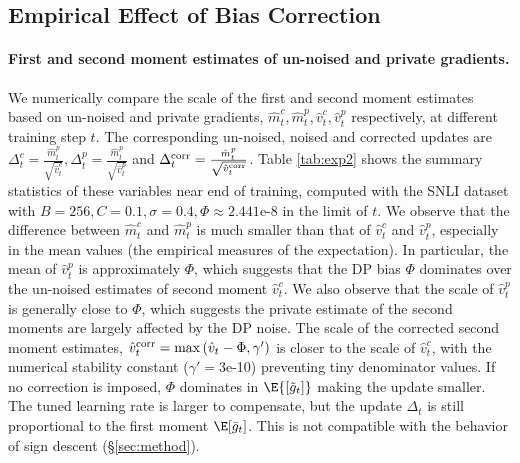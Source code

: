 \documentclass[letterpaper]{article} %
\begin{document}
\subsection{Empirical Effect of Bias Correction}
\label{eval:empirical-effect-correction}

\paragraph{First and second moment estimates of un-noised and private gradients.}
We numerically compare the scale of the first and second moment estimates based on un-noised and private gradients, $\hat{m}_t^c, \hat{m}_t^p, \hat{v}_t^c, \hat{v}_t^p$ respectively, at different training step $t$. The corresponding un-noised, noised and corrected updates are $\Delta_t^{c} = \frac{\hat{m}_t^p}{\sqrt{\hat{v}_t^c}}, \Delta_t^{p} = \frac{\hat{m}_t^p}{\sqrt{\hat{v}_t^p}}$ and $\Delta_t^{\textnormal{corr}} = \frac{\hat{m}_t^p}{\sqrt{\hat{v}_t^\textnormal{corr}}}$.
Table \ref{tab:exp2} shows the summary statistics of these variables near end of training, computed with the SNLI dataset with $B=256, C=0.1, \sigma=0.4, \Phi \approx 2.441$e-8 in the limit of $t$.
We observe that the difference between $\hat{m}_t^{c}$ and $\hat{m}_t^{p}$ is much smaller than that of $\hat{v}_t^{c}$ and $\hat{v}_t^{p}$, especially in the mean values (the empirical measures of the expectation). In particular, the mean of $\hat{v}_t^{p}$ is approximately $\Phi$, which suggests that the DP bias $\Phi$ dominates over the un-noised estimates of second moment $\hat{v}_t^{c}$.
We also observe that the scale of $\hat{v}_t^{p}$ is generally close to $\Phi$, which suggests the private estimate of the second moments are largely affected by the DP noise.
The scale of the corrected second moment estimates, $\hat{v}_t^{\textnormal{corr}} = \max{(\hat{v}_t - \Phi , \gamma')}$ is closer to the scale of $\hat{v}_t^{c}$, with the numerical stability constant ($\gamma'=3$e-10) preventing tiny denominator values.
If no correction is imposed, $\Phi$ dominates in $\E{[\tilde{g}_t]}$ making the update smaller. The tuned learning rate is larger to compensate, but the update $\Delta_t$ is still proportional to the first moment $\E[\bar{g}_t]$. This is not compatible with the behavior of sign descent (\S\ref{sec:method}).
\end{document}
